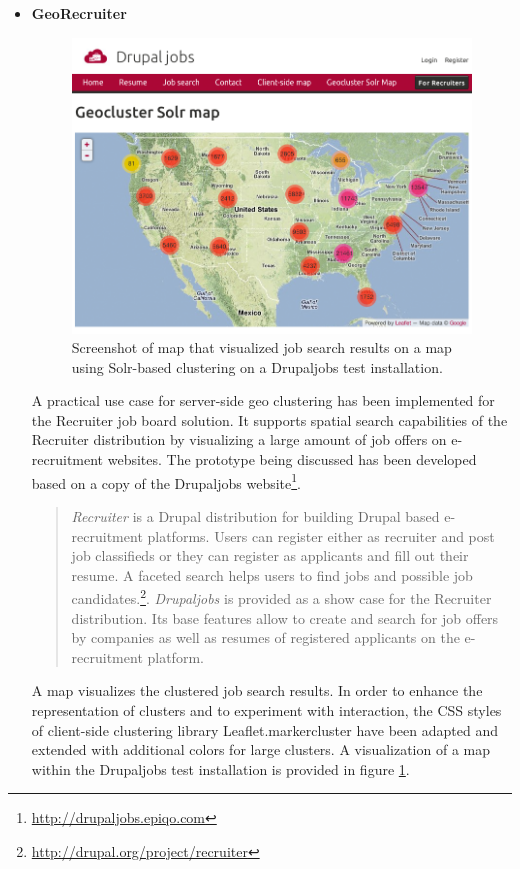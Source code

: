 \begin{itemize}
\item \textbf{GeoRecruiter}

\begin{figure}[h]
  \begin{center}
    \includegraphics[width=1\textwidth]{figures/drupaljobs_geocluster_solr.png}
    \caption{Screenshot of map that visualized job search results on a map using Solr-based clustering on a Drupaljobs test installation.}
    \label{fig:drupaljobs-geocluster-solr}
  \end{center}
\end{figure}

A practical use case for server-side geo clustering has been implemented for the Recruiter job board solution. It supports spatial search capabilities of the Recruiter distribution by visualizing a large amount of job offers on e-recruitment websites. The prototype being discussed has been developed based on a copy of the Drupaljobs website\footnote{\url{http://drupaljobs.epiqo.com}}.

\begin{quote}
\textit{Recruiter} is a Drupal distribution for building Drupal based e-recruitment platforms. Users can register either as recruiter and post job classifieds or they can register as applicants and fill out their resume. A faceted search helps users to find jobs and possible job candidates.\footnote{\url{http://drupal.org/project/recruiter}}. \textit{Drupaljobs} is provided as a show case for the Recruiter distribution. Its base features allow to create and search for job offers by companies as well as resumes of registered applicants on the e-recruitment platform.
\end{quote}


A map visualizes the clustered job search results. In order to enhance the representation of clusters and to experiment with interaction, the CSS styles of client-side clustering library Leaflet.markercluster have been adapted and extended with additional colors for large clusters. A visualization of a map within the Drupaljobs test installation is provided in figure \ref{fig:drupaljobs-geocluster-solr}.




\end{itemize}

